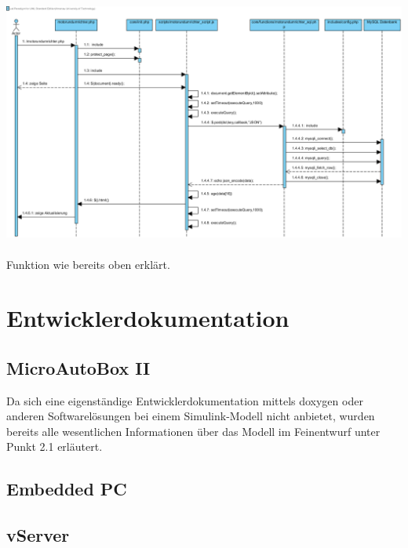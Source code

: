 \documentclass[fontsize = 12pt, paper = a4]{scrreprt}
\begin{document}
\includegraphics[scale=0.5]{motorundumrichter.png}
\\ \\
Funktion wie bereits oben erklärt.







\chapter{Entwicklerdokumentation}




\section{MicroAutoBox II}

Da sich eine eigenständige Entwicklerdokumentation mittels doxygen oder anderen Softwarelösungen bei einem Simulink-Modell nicht anbietet, wurden bereits alle wesentlichen Informationen über das Modell im Feinentwurf unter Punkt 2.1 erläutert.


\section{Embedded PC}


\section{vServer}
\end{document}

